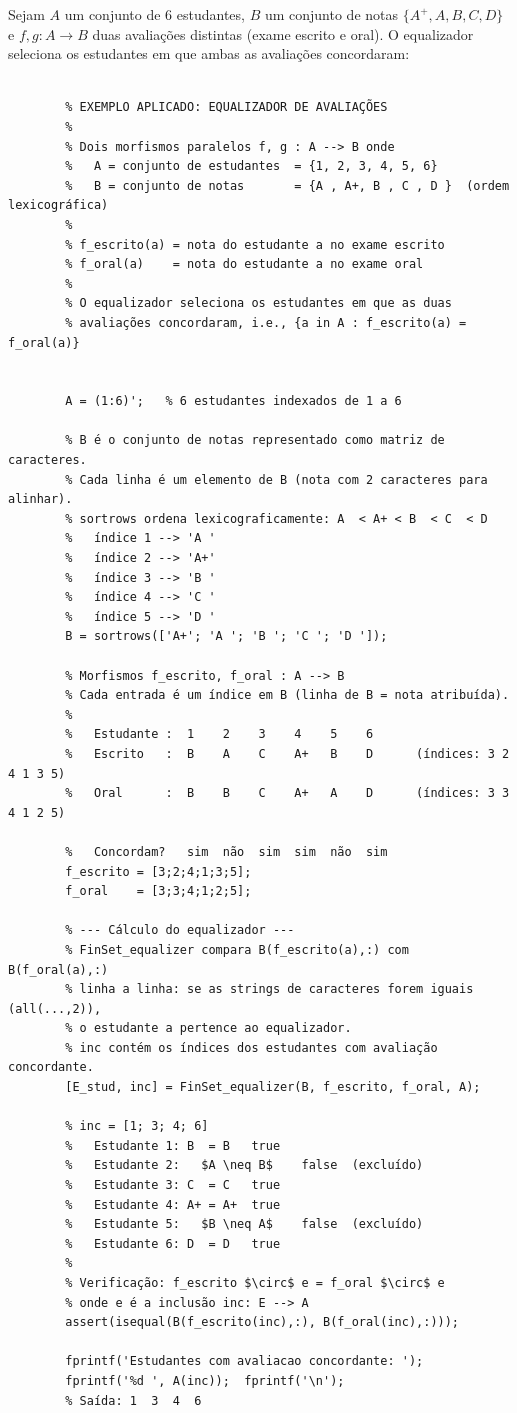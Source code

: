 \begin{example}
	Sejam $A$ um conjunto de 6 estudantes, $B$ um conjunto de notas
	$\{A^+, A, B, C, D\}$ e $f, g : A \to B$ duas avaliações distintas
	(exame escrito e oral). O equalizador seleciona os estudantes em
	que ambas as avaliações concordaram:
	
	\begin{lstlisting}[style=matlab, caption={Equalizador aplicado a avaliações}]

		% EXEMPLO APLICADO: EQUALIZADOR DE AVALIAÇÕES
		%
		% Dois morfismos paralelos f, g : A --> B onde
		%   A = conjunto de estudantes  = {1, 2, 3, 4, 5, 6}
		%   B = conjunto de notas       = {A , A+, B , C , D }  (ordem lexicográfica)
		%
		% f_escrito(a) = nota do estudante a no exame escrito
		% f_oral(a)    = nota do estudante a no exame oral
		%
		% O equalizador seleciona os estudantes em que as duas
		% avaliações concordaram, i.e., {a in A : f_escrito(a) = f_oral(a)}

		
		A = (1:6)';   % 6 estudantes indexados de 1 a 6
		
		% B é o conjunto de notas representado como matriz de caracteres.
		% Cada linha é um elemento de B (nota com 2 caracteres para alinhar).
		% sortrows ordena lexicograficamente: A  < A+ < B  < C  < D
		%   índice 1 --> 'A '
		%   índice 2 --> 'A+'
		%   índice 3 --> 'B '
		%   índice 4 --> 'C '
		%   índice 5 --> 'D '
		B = sortrows(['A+'; 'A '; 'B '; 'C '; 'D ']);
		
		% Morfismos f_escrito, f_oral : A --> B
		% Cada entrada é um índice em B (linha de B = nota atribuída).
		%
		%   Estudante :  1    2    3    4    5    6
		%   Escrito   :  B    A    C    A+   B    D      (índices: 3 2 4 1 3 5)
		%   Oral      :  B    B    C    A+   A    D      (índices: 3 3 4 1 2 5)

		%   Concordam?   sim  não  sim  sim  não  sim
		f_escrito = [3;2;4;1;3;5];
		f_oral    = [3;3;4;1;2;5];
		
		% --- Cálculo do equalizador ---
		% FinSet_equalizer compara B(f_escrito(a),:) com B(f_oral(a),:)
		% linha a linha: se as strings de caracteres forem iguais (all(...,2)),
		% o estudante a pertence ao equalizador.
		% inc contém os índices dos estudantes com avaliação concordante.
		[E_stud, inc] = FinSet_equalizer(B, f_escrito, f_oral, A);
		
		% inc = [1; 3; 4; 6]
		%   Estudante 1: B  = B   true
		%   Estudante 2:   $A \neq B$    false  (excluído)
		%   Estudante 3: C  = C   true
		%   Estudante 4: A+ = A+  true
		%   Estudante 5:   $B \neq A$    false  (excluído)
		%   Estudante 6: D  = D   true
		%
		% Verificação: f_escrito $\circ$ e = f_oral $\circ$ e
		% onde e é a inclusão inc: E --> A
		assert(isequal(B(f_escrito(inc),:), B(f_oral(inc),:)));
		
		fprintf('Estudantes com avaliacao concordante: ');
		fprintf('%d ', A(inc));  fprintf('\n');
		% Saída: 1  3  4  6
	\end{lstlisting}
\end{example}

